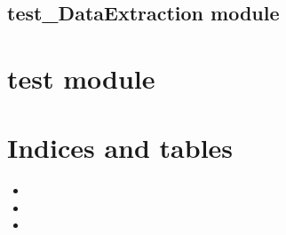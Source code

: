 \documentclass[letterpaper,10pt,english]{sphinxmanual}
\begin{document}
\sphinxstepscope


\section{test\_DataExtraction module}
\label{\detokenize{test_DataExtraction:module-test_DataExtraction}}\label{\detokenize{test_DataExtraction:test-dataextraction-module}}\label{\detokenize{test_DataExtraction::doc}}

\begin{fulllineitems}
\label{\detokenize{test_DataExtraction:test_DataExtraction.test_filter}}
\pysigstartsignatures
{}
\pysigstopsignatures
\end{fulllineitems}


\sphinxstepscope


\chapter{test module}
\label{\detokenize{test:test-module}}\label{\detokenize{test::doc}}

\chapter{Indices and tables}
\label{\detokenize{index:indices-and-tables}}\begin{itemize}
\item {} 
\sphinxAtStartPar
{}

\item {} 
\sphinxAtStartPar
{}

\item {} 
\sphinxAtStartPar
{}

\end{itemize}
\end{document}
